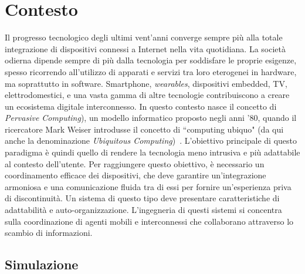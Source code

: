 \section{Contesto}
Il progresso tecnologico degli ultimi vent'anni converge sempre più alla totale integrazione di dispositivi connessi a Internet nella vita quotidiana. La società odierna dipende sempre di più dalla tecnologia per soddisfare le proprie esigenze, spesso ricorrendo all'utilizzo di apparati e servizi tra loro eterogenei in hardware, ma soprattutto in software. Smartphone, \textit{wearables}, dispositivi embedded, TV, elettrodomestici, e una vasta gamma di altre tecnologie contribuiscono a creare un ecosistema digitale interconnesso. In questo contesto nasce il concetto di \textit{Pervasive Computing}), un modello informatico proposto negli anni '80, quando il ricercatore Mark Weiser introdusse il concetto di ``computing ubiquo" (da qui anche la denominazione \textit{Ubiquitous Computing})~\cite{Weiser2002}.
L'obiettivo principale di questo paradigma è quindi quello di rendere la tecnologia meno intrusiva e più adattabile al contesto dell'utente.   Per raggiungere questo obiettivo, è necessario un coordinamento efficace dei dispositivi, che deve garantire un'integrazione armoniosa e una comunicazione fluida tra di essi per fornire un'esperienza priva di discontinuità. Un sistema di questo tipo deve presentare caratteristiche di adattabilità e auto-organizzazione.
L'ingegneria di questi sistemi si concentra sulla coordinazione di agenti mobili e interconnessi che collaborano attraverso lo scambio di informazioni.
\subsection{Simulazione}

